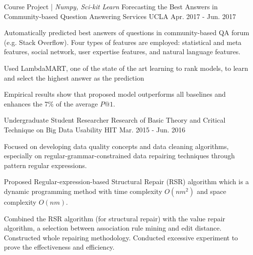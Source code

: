 \begin{cventries}
\cventry
  {Course Project | \textit{Numpy, Sci-kit Learn}}
	{Forecasting the Best Answers in Community-based Question Answering Services}
	{UCLA}
	{Apr. 2017 - Jun. 2017}
	{
		\begin{cvitems}
			\item {Automatically predicted best answers of questions in community-based QA forum (e.g. Stack Overflow). Four types of features are employed: statistical and meta features, social network, user expertise features, and natural language features.}
			\item {Used LambdaMART, one of the state of the art learning to rank models, to learn and select the highest answer as the prediction}
			\item {Empirical results show that proposed model outperforms all baselines and enhances the 7\% of the average $P@1$.}
		\end{cvitems}
	}
\vspace{-1em}
  \cventry
    {Undergraduate Student Researcher}
    {Research of Basic Theory and Critical Technique on Big Data Usability}
    {HIT}
    {Mar. 2015 - Jun. 2016}
    {
      \begin{cvitems}
        \item{Focused on developing data quality concepts and data cleaning algorithms, especially on  regular-grammar-constrained data repairing techniques through pattern regular expressions.}
        \item{Proposed Regular-expression-based Structural Repair (RSR) algorithm which is a dynamic programming method with time complexity $O(nm^2)$ and space complexity $O(nm)$.}
        \item{Combined the RSR algorithm (for structural repair) with the value repair algorithm, a selection between association rule mining and edit distance. Constructed whole repairing methodology. Conducted excessive experiment to prove the effectiveness and efficiency.}

\end{cvitems}}
\end{cventries}
